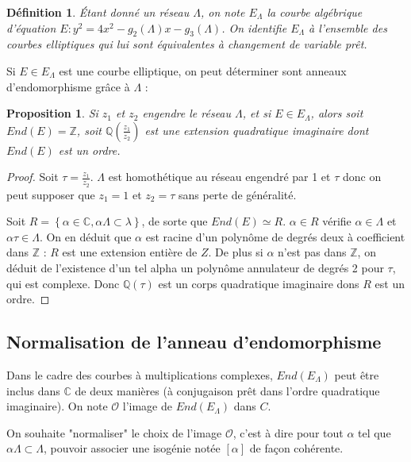 \documentclass{article}
\newcommand{\Z}[0]{\mathbb{Z}}
\newcommand{\Q}[0]{\mathbb{Q}}
\newcommand{\C}[0]{\mathbb{C}}
\newcommand{\OR}[0]{\mathcal{O}}
\newtheorem{Prop}[The]{Proposition}
\newtheorem{Def}[The]{Définition}
\begin{document}
\begin{Def}
	Étant donné un réseau $\Lambda$, on note $E_{\Lambda}$ la courbe algébrique d'équation $E : y^{2} = 4x^{2} - g_2 \left( \Lambda\right) x - g_3\left( \Lambda\right)$. On identifie $E_{\Lambda}$ à l'ensemble des courbes elliptiques qui lui sont équivalentes à changement de variable prêt. 
\end{Def}

Si $E\in E_{\Lambda}$ est une courbe elliptique, on peut déterminer sont anneaux d'endomorphisme grâce à $\Lambda$ :

\begin{Prop}
	Si $z_1$ et $z_2$ engendre le réseau $\Lambda$, et si $E\in E_{\Lambda}$, alors soit $End(E) = \Z$, soit $\Q\left( \frac{z_1}{z_2}\right)$ est une extension quadratique imaginaire dont $End(E)$ est un ordre. 
\end{Prop}

\begin{proof}
	Soit $\tau = \frac{z_1}{z_2}$. $\Lambda$ est homothétique au réseau engendré par 1 et $\tau$ donc on peut supposer que $z_1 = 1$ et $z_2 = \tau$ sans perte de généralité. 
	
	Soit $R =  \left\lbrace\alpha\in\C, \alpha\Lambda\subset\lambda\right\rbrace$, de sorte que $End(E)\simeq R$. $\alpha\in R$ vérifie $\alpha\in\Lambda$ et $\alpha\tau\in\Lambda$. On en déduit que $\alpha$ est racine d'un polynôme de degrés deux à coefficient dans $\Z$ : $R$ est une extension entière de $Z$. De plus si $\alpha$ n'est pas dans $\Z$, on déduit de l'existence d'un tel alpha un polynôme annulateur de degrés 2 pour $\tau$, qui est complexe. Donc $\Q\left(\tau\right)$ est un corps quadratique imaginaire dons $R$ est un ordre. 
\end{proof}









\subsection{Normalisation de l'anneau d'endomorphisme}


Dans le cadre des courbes à multiplications complexes, $End(E_{\Lambda})$ peut être inclus dans $\C$ de deux manières (à conjugaison prêt dans l'ordre quadratique imaginaire). On note $\OR$ l'image de $End(E_{\Lambda})$ dans $C$. 

On souhaite "normaliser" le choix de l'image $\OR$, c'est à dire pour tout $\alpha$ tel que $\alpha\Lambda\subset\Lambda$, pouvoir associer une isogénie notée $[\alpha]$ de façon cohérente.
\end{document}
